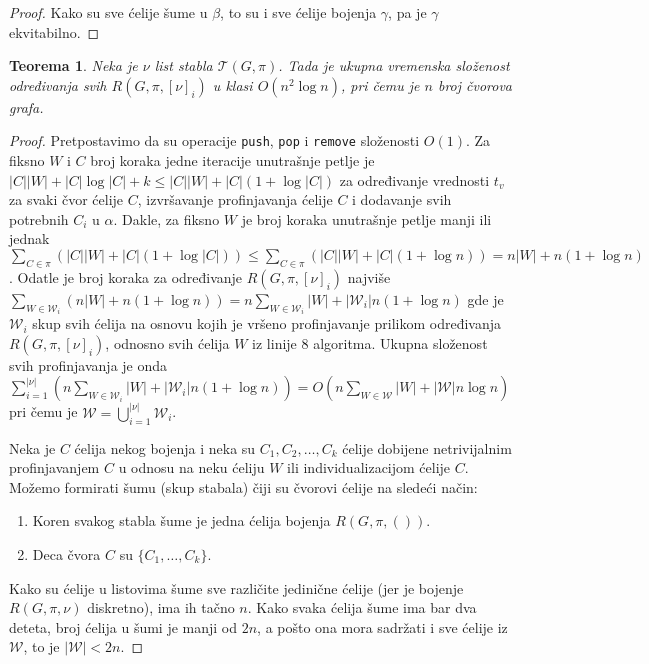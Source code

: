\documentclass[12pt,oneside]{memoir}
\newtheorem{theorem}{Teorema}
\theoremstyle{definition}
\begin{document}
\begin{proof}
	  Kako su sve ćelije šume u $\beta$, to su i sve ćelije bojenja $\gamma$,
	  pa je $\gamma$ ekvitabilno.
  \end{proof}

  \begin{theorem}
	  Neka je $\nu$ list stabla $\mathcal{T}(G, \pi)$. Tada je ukupna vremenska
	  složenost određivanja svih $R(G, \pi, [\nu]_i)$ u klasi $O(n^2 \log n)$,
	  pri čemu je $n$ broj čvorova grafa.
  \end{theorem}

  \begin{proof}
	  Pretpostavimo da su operacije \texttt{push}, \texttt{pop} i
	  \texttt{remove} složenosti $O(1)$. Za fiksno $W$ i $C$ broj koraka jedne
	  iteracije unutrašnje petlje je $|C||W| + |C| \log |C| + k \leq |C||W| +
	  |C| (1 + \log |C|)$ za određivanje vrednosti $t_v$ za svaki čvor ćelije
	  $C$, izvršavanje profinjavanja ćelije $C$ i dodavanje svih potrebnih
	  $C_i$ u $\alpha$. Dakle, za fiksno $W$ je broj koraka unutrašnje petlje
	  manji ili jednak $\sum_{C \in \pi}(|C||W| + |C| (1 + \log |C|)) \leq
	  \sum_{C \in \pi}(|C||W| + |C| (1 + \log n)) = n|W| + n(1 + \log n)$.
	  Odatle je broj koraka za određivanje $R(G, \pi, [\nu]_i)$ najviše
	  $\sum_{W \in \mathcal{W}_i} (n|W| + n(1 + \log n)) = n \sum_{W \in
	  \mathcal{W}_i} |W| + |\mathcal{W}_i| n (1 + \log n)$ gde je
	  $\mathcal{W}_i$ skup svih ćelija na osnovu kojih je vršeno profinjavanje
	  prilikom određivanja $R(G, \pi, [\nu]_i)$, odnosno svih ćelija $W$ iz
	  linije 8 algoritma. Ukupna složenost svih profinjavanja je onda
	  $\sum_{i=1}^{|\nu|}(n \sum_{W \in \mathcal{W}_i} |W| + |\mathcal{W}_i| n
	  (1 + \log n)) = O(n \sum_{W \in \mathcal{W}} |W| + |\mathcal{W}| n \log
	  n)$ pri čemu je $\mathcal{W} = \bigcup_{i = 1}^{|\nu|}\mathcal{W}_i$.

	  Neka je $C$ ćelija nekog bojenja i neka su $C_1, C_2, \dots, C_k$ ćelije
	  dobijene netrivijalnim profinjavanjem $C$ u odnosu na neku ćeliju $W$ ili
	  individualizacijom ćelije $C$. Možemo formirati šumu (skup stabala) čiji
	  su čvorovi ćelije na sledeći način:
	  \begin{enumerate}
		  \item Koren svakog stabla šume je jedna ćelija bojenja $R(G, \pi, ())$.
		  \item Deca čvora $C$ su $\{C_1, \dots, C_k\}$.
	  \end{enumerate}

	  Kako su ćelije u listovima šume sve različite jedinične ćelije (jer je
	  bojenje $R(G, \pi, \nu)$ diskretno), ima ih tačno $n$. Kako svaka ćelija
	  šume ima bar dva deteta, broj ćelija u šumi je manji od $2n$, a pošto ona
	  mora sadržati i sve ćelije iz $\mathcal{W}$, to je $|\mathcal{W}| < 2n$.


\end{proof}
\end{document}

